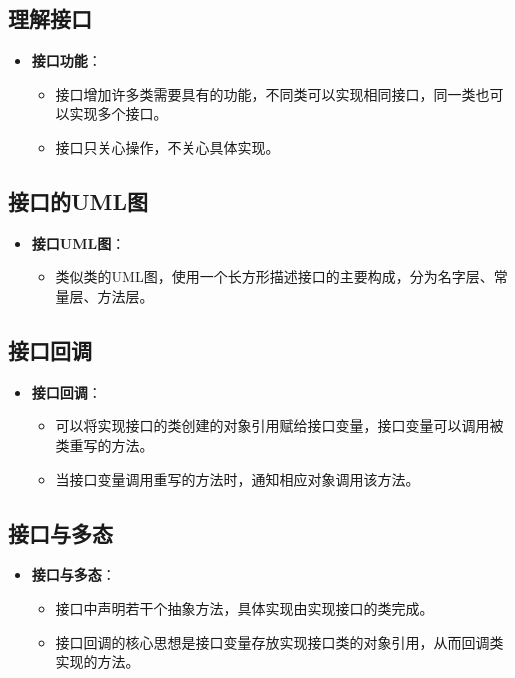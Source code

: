 \documentclass[a4paper, 10pt]{ctexart}
\begin{document}
\subsection{理解接口}
\begin{itemize}
  \item \textbf{接口功能}：
  \begin{itemize}
    \item 接口增加许多类需要具有的功能，不同类可以实现相同接口，同一类也可以实现多个接口。
    \item 接口只关心操作，不关心具体实现。
  \end{itemize}
\end{itemize}

\subsection{接口的UML图}
\begin{itemize}
  \item \textbf{接口UML图}：
  \begin{itemize}
    \item 类似类的UML图，使用一个长方形描述接口的主要构成，分为名字层、常量层、方法层。
  \end{itemize}
\end{itemize}

\subsection{接口回调}
\begin{itemize}
  \item \textbf{接口回调}：
  \begin{itemize}
    \item 可以将实现接口的类创建的对象引用赋给接口变量，接口变量可以调用被类重写的方法。
    \item 当接口变量调用重写的方法时，通知相应对象调用该方法。
  \end{itemize}
\end{itemize}

\subsection{接口与多态}
\begin{itemize}
  \item \textbf{接口与多态}：
  \begin{itemize}
    \item 接口中声明若干个抽象方法，具体实现由实现接口的类完成。
    \item 接口回调的核心思想是接口变量存放实现接口类的对象引用，从而回调类实现的方法。
  \end{itemize}
\end{itemize}
\end{document}
